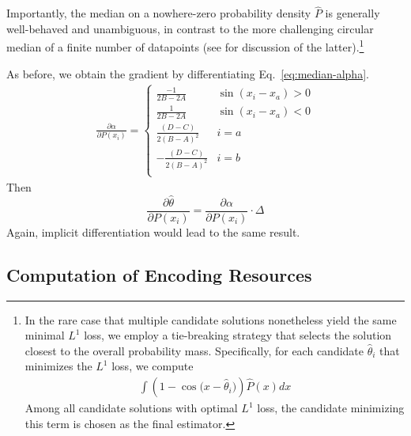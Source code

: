 Importantly, the median on a nowhere-zero probability density $\widehat{P}$ is generally well-behaved and unambiguous, in contrast to the more challenging circular median of a finite number of datapoints (see \citet{otieno2003more} for discussion of the latter).\footnote{In the rare case that multiple candidate solutions nonetheless yield the same minimal $L^1$ loss, we employ a tie-breaking strategy that selects the solution closest to the overall probability mass. Specifically, for each candidate $\widehat{\theta}_i$ that minimizes the $L^1$ loss, we compute
\begin{align*}
    \int (1-\cos\bigl(x - \widehat{\theta}_i\bigr)) \widehat{P}(x)  dx
\end{align*}
Among all candidate solutions with optimal $L^1$ loss, the candidate minimizing this term is chosen as the final estimator.}



As before, we obtain the gradient by differentiating Eq.~\ref{eq:median-alpha}. 
\begin{align*}
    \frac{\partial \alpha}{\partial P(x_i)} = \begin{cases}
        \frac{-1}{2B-2A} & \sin(x_i-x_a) > 0 \\
        \frac{1}{2B-2A} & \sin(x_i-x_a) < 0 \\
      \frac{(D-C)}{2(B-A)^2}  & i=a \\
        -\frac{(D-C)}{2(B-A)^2} & i=b \\
    \end{cases}
\end{align*}
Then
\begin{equation}
    \frac{\partial \widehat{\theta}}{\partial P(x_i)} = \frac{\partial \alpha}{\partial P(x_i)} \cdot \Delta
\end{equation}
Again, implicit differentiation would lead to the same result. 

\subsection{Computation of Encoding Resources}\label{sec:compute-fi}


